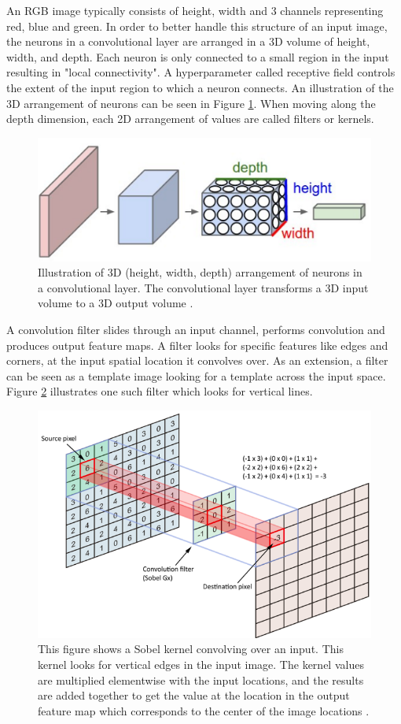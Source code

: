 An RGB image typically consists of height, width and 3 channels representing red, blue and green. In order to better handle this structure of an input image, the neurons in a convolutional layer are arranged in a 3D volume of height, width, and depth. Each neuron is only connected to a small region in the input resulting in "local connectivity".  A hyperparameter called receptive field \cite{cs231n} controls the extent of the input region to which a neuron connects. An illustration of the 3D arrangement of neurons can be seen in Figure \ref{Fig:cnn_neuron}. When moving along the depth dimension, each 2D arrangement of values are called filters or kernels.

	\begin{figure}[h]
		\centering
		\includegraphics[width=.4\linewidth]{images/conv_3dneurons}
		\caption{Illustration of 3D (height, width, depth) arrangement of neurons in a convolutional layer. The convolutional layer transforms a 3D input volume to a 3D output volume  \cite{cs231n}.}
		\label{Fig:cnn_neuron}
	\end{figure}
	
A convolution filter slides through an input channel, performs convolution and produces output feature maps. A filter looks for specific features like edges and corners, at the input spatial location it convolves over. As an extension, a filter can be seen as a template image looking for a template across the input space. Figure \ref{Fig:convolution} illustrates one such filter which looks for vertical lines. 

	\begin{figure}[h]
		\centering
		\includegraphics[width=.8\linewidth]{images/convolution}
		\caption{This figure shows a Sobel kernel convolving over an input. This kernel looks for vertical edges in the input image. The kernel values are multiplied elementwise with the input locations, and the results are added together to get the value at the location in the output feature map which corresponds to the center of the image locations  \cite{freecodecamp}.}
		\label{Fig:convolution}
	\end{figure}
	

